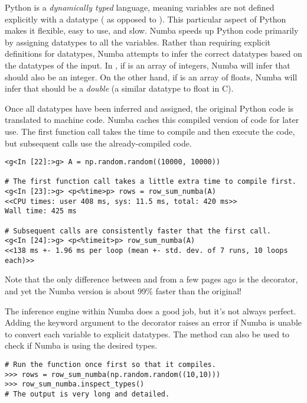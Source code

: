 Python is a \emph{dynamically typed} language, meaning variables are not defined explicitly with a datatype ( as opposed to ).
This particular aspect of Python makes it flexible, easy to use, and slow.
Numba speeds up Python code primarily by assigning datatypes to all the variables.
Rather than requiring explicit definitions for datatypes, Numba attempts to infer the correct datatypes based on the datatypes of the input.
In , if  is an array of integers, Numba will infer that  should also be an integer.
On the other hand, if  is an array of floats, Numba will infer that  should be a \emph{double} (a similar datatype to float in C).

Once all datatypes have been inferred and assigned, the original Python code is translated to machine code. %
Numba caches this compiled version of code for later use.
The first function call takes the time to compile and then execute the code, but subsequent calls use the already-compiled code.

\begin{lstlisting}
<g<In [22]:>g> A = np.random.random((10000, 10000))

# The first function call takes a little extra time to compile first.
<g<In [23]:>g> <p<%time>p> rows = row_sum_numba(A)
<<CPU times: user 408 ms, sys: 11.5 ms, total: 420 ms>>
Wall time: 425 ms

# Subsequent calls are consistently faster that the first call.
<g<In [24]:>g> <p<%timeit>p> row_sum_numba(A)
<<138 ms +- 1.96 ms per loop (mean +- std. dev. of 7 runs, 10 loops each)>>
\end{lstlisting}

Note that the only difference between  and  from a few pages ago is the  decorator, and yet the Numba version is about 99\% faster than the original!

The inference engine within Numba does a good job, but it's not always perfect.
Adding the keyword argument  to the  decorator raises an error if Numba is unable to convert each variable to explicit datatypes.
The  method can also be used to check if Numba is using the desired types.

\begin{lstlisting}
# Run the function once first so that it compiles.
>>> rows = row_sum_numba(np.random.random((10,10)))
>>> row_sum_numba.inspect_types()
# The output is very long and detailed.
\end{lstlisting}

